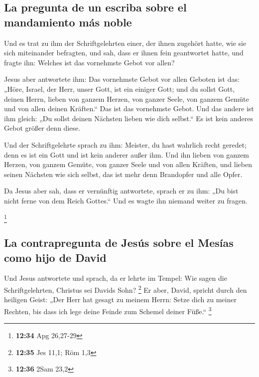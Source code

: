 \hypertarget{la-pregunta-de-un-escriba-sobre-el-mandamiento-muxe1s-noble}{%
\subsection{La pregunta de un escriba sobre el mandamiento más
noble}\label{la-pregunta-de-un-escriba-sobre-el-mandamiento-muxe1s-noble}}

 Und es trat zu ihm der Schriftgelehrten einer, der ihnen
zugehört hatte, wie sie sich miteinander befragten, und sah, dass er
ihnen fein geantwortet hatte, und fragte ihn: Welches ist das vornehmste
Gebot vor allen?

 Jesus aber antwortete ihm: Das vornehmste Gebot vor
allen Geboten ist das: „Höre, Israel, der Herr, unser Gott, ist ein
einiger Gott;  und du sollst Gott, deinen Herrn, lieben
von ganzem Herzen, von ganzer Seele, von ganzem Gemüte und von allen
deinen Kräften.`` Das ist das vornehmste Gebot.  Und das
andere ist ihm gleich: „Du sollst deinen Nächsten lieben wie dich
selbst.`` Es ist kein anderes Gebot größer denn diese.

 Und der Schriftgelehrte sprach zu ihm: Meister, du hast
wahrlich recht geredet; denn es ist ein Gott und ist kein anderer außer
ihm.  Und ihn lieben von ganzem Herzen, von ganzem
Gemüte, von ganzer Seele und von allen Kräften, und lieben seinen
Nächsten wie sich selbst, das ist mehr denn Brandopfer und alle Opfer.

 Da Jesus aber sah, dass er vernünftig antwortete, sprach
er zu ihm: „Du bist nicht ferne von dem Reich Gottes.`` Und es wagte ihn
niemand weiter zu fragen.

\footnote{\textbf{12:34} Apg 26,27-29}

\hypertarget{la-contrapregunta-de-jesuxfas-sobre-el-mesuxedas-como-hijo-de-david}{%
\subsection{La contrapregunta de Jesús sobre el Mesías como hijo de
David}\label{la-contrapregunta-de-jesuxfas-sobre-el-mesuxedas-como-hijo-de-david}}

 Und Jesus antwortete und sprach, da er lehrte im Tempel:
Wie sagen die Schriftgelehrten, Christus sei Davids Sohn? \footnote{\textbf{12:35}
  Jes 11,1; Röm 1,3}  Er aber, David, spricht durch den
heiligen Geist: „Der Herr hat gesagt zu meinem Herrn: Setze dich zu
meiner Rechten, bis dass ich lege deine Feinde zum Schemel deiner
Füße.`` \footnote{\textbf{12:36} 2Sam 23,2}

